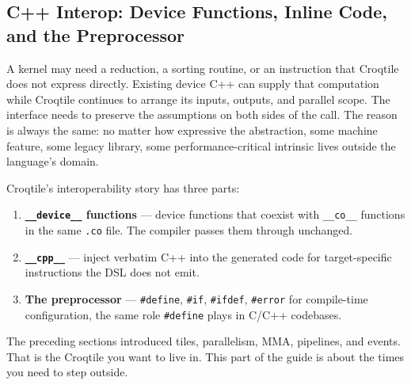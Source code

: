 \subsection*{C++ Interop: Device Functions, Inline Code, and the Preprocessor}

A kernel may need a reduction, a sorting routine, or an instruction that Croqtile does not express directly. Existing device C++ can supply that computation while Croqtile continues to arrange its inputs, outputs, and parallel scope. The interface needs to preserve the assumptions on both sides of the call. The reason is always the same: no matter how expressive the abstraction, some machine feature, some legacy library, some performance-critical intrinsic lives outside the language's domain.

Croqtile's interoperability story has three parts:

\begin{enumerate}[leftmargin=1.6em]
\item \textbf{\texttt{\_\_device\_\_} functions} --- device functions that coexist with \texttt{\_\_co\_\_} functions in the same \texttt{.co} file. The compiler passes them through unchanged.
\item \textbf{\texttt{\_\_cpp\_\_}} --- inject verbatim C++ into the generated code for target-specific instructions the DSL does not emit.
\item \textbf{The preprocessor} --- \texttt{\#define}, \texttt{\#if}, \texttt{\#ifdef}, \texttt{\#error} for compile-time configuration, the same role \texttt{\#define} plays in C/C++ codebases.
\end{enumerate}

The preceding sections introduced tiles, parallelism, MMA, pipelines, and events. That is the Croqtile you want to live in. This part of the guide is about the times you need to step outside.
